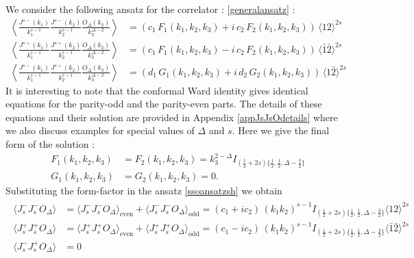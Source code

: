 \documentclass[a4paper,11pt]{article}
\begin{document}
We consider the following ansatz for the correlator :
\eqref{generalansatz} :
\begin{align}\label{ssoansatzsh}
\left\langle \frac{J^{s-}(k_1)}{k_1^{s-1}}\frac{J^{s-}(k_2)}{k_2^{s-1}}\frac{O_{\Delta}(k_3)}{k_3^{\Delta-2}} \right\rangle &=(c_1\,{F}_1(k_1, k_2, k_3)+i\,c_2\,{F}_2(k_1, k_2, k_3))\,\langle 12 \rangle^{2s}\nonumber\\
\left\langle \frac{J^{s+}(k_1)}{k_1^{s-1}}\frac{J^{s+}(k_2)}{k_2^{s-1}}\frac{O_{\Delta}(k_3)}{k_3^{\Delta-2}} \right\rangle &=(c_1\,{F}_1(k_1, k_2, k_3)-i\,c_2\,{F}_2(k_1, k_2, k_3))\,\langle {\bar {1}}{\bar {2}} \rangle^{2s}\nonumber\\
\left\langle \frac{J^{s-}(k_1)}{k_1^{s-1}}\frac{J^{s+}(k_2)}{k_2^{s-1}}\frac{O_{\Delta}(k_3)}{k_3^{\Delta-2}} \right\rangle &=(d_1\,{G}_1(k_1, k_2, k_3)+i\,d_2\,{G}_2(k_1, k_2, k_3))\,\langle 1{\bar{2}} \rangle^{2s}
\end{align}
It is interesting to note that the conformal Ward identity gives identical equations for the parity-odd and the parity-even parts. The details of these equations and their solution are provided in Appendix \ref{appJsJsOdetails} where we also discuss examples for special values of $\Delta$ and $s$. Here we give the final form of the solution :
\begin{align}
    \label{ssoformfactor}
 F_1(k_1, k_2, k_3)&= F_2(k_1, k_2, k_3)=k_3^{2-\Delta}I_{(\frac{1}{2}+2s)\{\frac{1}{2},\frac{1}{2},\Delta-\frac{3}{2}\}}\nonumber\\
     G_1(k_1, k_2, k_3)&= G_2(k_1, k_2, k_3)=0.
\end{align}
Substituting the form-factor in the ansatz \eqref{ssoansatzsh} we obtain 
\begin{align}
\begin{split}
\langle J_s^- J_s^- O_{\Delta} \rangle&=\langle J_s^- J_s^- O_{\Delta} \rangle_{\text{even}}+\langle J_s^- J_s^- O_{\Delta} \rangle_{\text{odd}}=\left(c_1+ i c_2\right)\,\left(k_1 k_2\right)^{s-1} I_{(\frac{1}{2}+2s)\{\frac{1}{2},\frac{1}{2},\Delta-\frac{3}{2}\}} \langle 12 \rangle^{2s}\\[5 pt]
\langle J_s^+ J_s^+ O_{\Delta} \rangle&=\langle J_s^+ J_s^+ O_{\Delta} \rangle_{\text{even}}+\langle J_s^+ J_s^+ O_{\Delta} \rangle_{\text{odd}}=\left(c_1 - i c_2\right)\,\left(k_1 k_2\right)^{s-1} I_{(\frac{1}{2}+2s)\{\frac{1}{2},\frac{1}{2},\Delta-\frac{3}{2}\}} \langle \bar 1\bar 2 \rangle^{2s}\\[5 pt]
\langle J_s^- J_s^+ O_{\Delta} \rangle &= 0\label{jjofinalanswersh}
\end{split}
\end{align}
\end{document}
